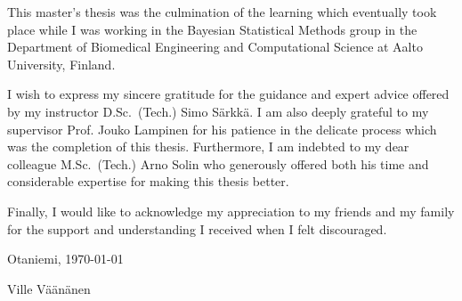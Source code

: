 This master's thesis was the culmination of the learning
which eventually took place while I was working in 
the Bayesian Statistical 
Methods group in the Department of Biomedical 
Engineering and Computational Science at Aalto University, Finland.

I wish to express my sincere gratitude for the guidance and
expert advice offered by my instructor D.Sc.\ (Tech.) 
Simo Särkkä. I am also deeply grateful to my supervisor 
Prof. Jouko Lampinen for his patience
in the delicate process which was the completion of this thesis.
Furthermore, I am indebted to my dear colleague 
M.Sc.\ (Tech.) Arno Solin who generously offered both his
time and considerable expertise for making this thesis
better.

Finally, I would like to acknowledge my appreciation
to my friends and my family for the support and understanding 
I received when I felt discouraged.


\vspace{5cm}
Otaniemi, \today

\vspace{5mm}
{\hfill Ville Väänänen \hspace{1cm}}